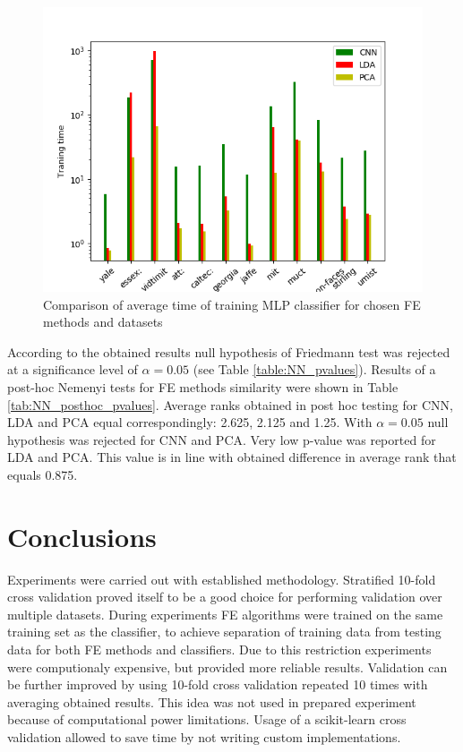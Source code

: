 \documentclass[a4paper, 10 pt, journal]{ieeeconf}
\begin{document}
\begin{figure}[!h]
    \centering
    \includegraphics[scale=0.875]{images/NN_fit_time_comparison.png}
    \caption{Comparison of average time of training MLP classifier for chosen FE methods and datasets}
    \label{fig:svm_fit_time_comparision}
\end{figure}

\newpage

According to the obtained results null hypothesis of Friedmann test was rejected at a significance level of $\alpha = 0.05$ (see Table \ref{table:NN_pvalues}). 
Results of a post-hoc Nemenyi tests for FE methods similarity were shown in Table \ref{tab:NN_posthoc_pvalues}. 
Average ranks obtained in post hoc testing for CNN, LDA and PCA equal correspondingly: 2.625, 2.125 and 1.25.
With $\alpha = 0.05$ null hypothesis was rejected for CNN and PCA.
Very low p-value was reported for LDA and PCA. This value is in line with obtained difference in average rank that equals 0.875.

\newpage


\section{Conclusions}

Experiments were carried out with established methodology. Stratified 10-fold cross validation proved itself to be a good choice for performing validation over multiple datasets. During experiments FE algorithms were trained on the same training set as the classifier, to achieve separation of training data from testing data for both FE methods and classifiers. Due to this restriction experiments were computionaly expensive, but provided more reliable results. Validation can be further improved by using 10-fold cross validation repeated 10 times with averaging obtained results. This idea was not used in prepared experiment because of computational power limitations. Usage of a scikit-learn cross validation allowed to save time by not writing custom implementations.
\end{document}
